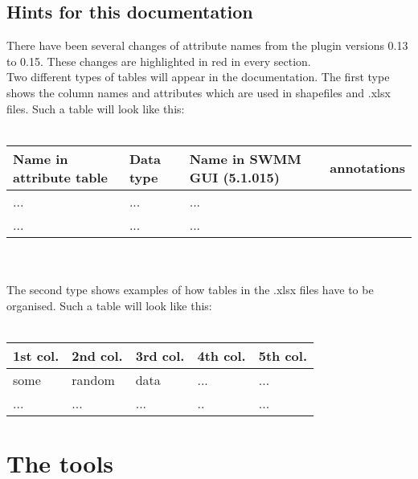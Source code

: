 \documentclass[10pt,a4paper,oneside]{scrbook}
\begin{document}
\section{Hints for this documentation} \label{Hints}
There have been several changes of attribute names from the plugin versions 0.13 to 0.15. These changes are highlighted in red in every section.\\
Two different types of tables will appear in the documentation. The first type shows the column names and attributes which are used in shapefiles and .xlsx files. Such a table will look like this:\\
\\
\begin{tabular}{p{1.7cm}|p{1.3cm}|P{3cm}|P{8cm}}
\hline 
\textbf{Name in attribute table} & \textbf{Data type} & \textbf{Name in SWMM GUI (5.1.015)} & \textbf{annotations}\\ 
\hline 
... & ... & ... & \\
... & ... & ... & \\
\hline
\end{tabular}
\\
\\
The second type shows examples of how tables in the .xlsx files have to be organised. Such a table will look like this:\\
\\
\begin{tabular}{|p{1.7cm}|p{1.7cm}|P{1.7cm}|P{1.7cm}|P{1.7cm}|}
\hline 
\textbf{1st col.} & \textbf{2nd col.} & \textbf{3rd col.} & \textbf{4th col.} & \textbf{5th col.}\\ 
\hline 
some & random & data & ... &...\\
\hline
... & ... & ...& .. &...\\
\hline
\end{tabular}

\chapter{The tools} \label{tools}
\end{document}
